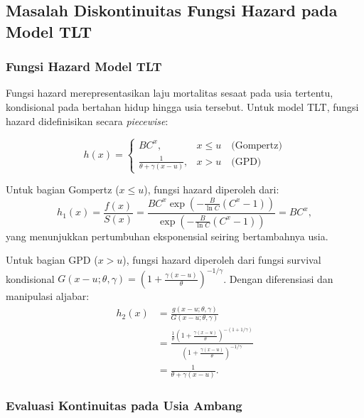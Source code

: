 \subsection{Masalah Diskontinuitas Fungsi Hazard pada Model TLT}

\subsubsection{Fungsi Hazard Model TLT}

Fungsi hazard merepresentasikan laju mortalitas sesaat pada usia tertentu, kondisional pada bertahan hidup hingga usia tersebut. Untuk model TLT, fungsi hazard didefinisikan secara \textit{piecewise}:

\begin{equation}
h(x) =
\begin{cases}
BC^x, & x \leq u \quad \text{(Gompertz)} \\[8pt]
\displaystyle\frac{1}{\theta + \gamma(x-u)}, & x > u \quad \text{(GPD)}
\end{cases}
\label{eq:tlt_hazard_piecewise}
\end{equation}

Untuk bagian Gompertz ($x \leq u$), fungsi hazard diperoleh dari:
\begin{equation}
h_1(x) = \frac{f(x)}{S(x)} = \frac{BC^x \exp\left(-\frac{B}{\ln C}(C^x - 1)\right)}{\exp\left(-\frac{B}{\ln C}(C^x - 1)\right)} = BC^x,
\label{eq:hazard_gompertz_derivation}
\end{equation}
yang menunjukkan pertumbuhan eksponensial seiring bertambahnya usia.

Untuk bagian GPD ($x > u$), fungsi hazard diperoleh dari fungsi survival kondisional $G(x-u; \theta, \gamma) = \left(1 + \frac{\gamma(x-u)}{\theta}\right)^{-1/\gamma}$. Dengan diferensiasi dan manipulasi aljabar:
\begin{align}
h_2(x) &= \frac{g(x-u; \theta, \gamma)}{G(x-u; \theta, \gamma)} \nonumber \\
&= \frac{\frac{1}{\theta}\left(1 + \frac{\gamma(x-u)}{\theta}\right)^{-(1+1/\gamma)}}{\left(1 + \frac{\gamma(x-u)}{\theta}\right)^{-1/\gamma}} \nonumber \\
&= \frac{1}{\theta + \gamma(x-u)}.
\label{eq:hazard_gpd_derivation}
\end{align}

\subsubsection{Evaluasi Kontinuitas pada Usia Ambang}

